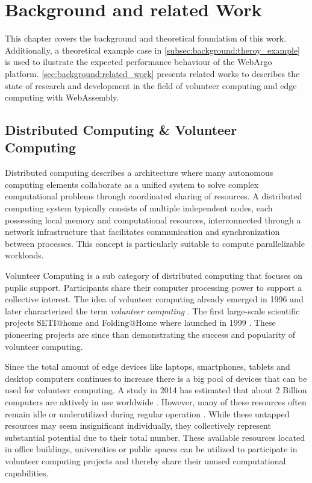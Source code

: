 \chapter{Background and related Work}
\label{ch:background}
This chapter covers the background and theoretical foundation of this work. Additionally, a theoretical example case in \autoref{subsec:background:theroy_example} is used to ilustrate the expected performance behaviour of the WebArgo platform. \autoref{sec:background:related_work} presents related works to describes the state of research and development in the field of volunteer computing and edge computing with WebAssembly.

\section{Distributed Computing \& Volunteer Computing}
Distributed computing describes a architecture where many autonomous computing elements collaborate as a unified system to solve complex computational problems through coordinated sharing of resources. A distributed computing system typically consists of multiple independent nodes, each possessing local memory and computational resources, interconnected through a network infrastructure that facilitates communication and synchronization between processes. This concept is particularly suitable to compute parallelizable workloads.

Volunteer Computing is a sub category of distributed computing that focuses on puplic support. Participants share their computer processing power to support a collective interest. The idea of volunteer computing already emerged in 1996 \cite{relatedwork:boinc1} and \citeauthor{background:vcname} later characterized the term \emph{volunteer computing} \cite{background:vcname}. The first large-scale scientific projects SETI@home and Folding@Home where launched in 1999 \cite{relatedwork:boinc1,relatedwork:seti}. These pioneering projects are since than demonstrating the success and popularity of volunteer computing.

Since the total amount of edge devices like laptops, smartphones, tablets and desktop computers continues to increase \cite{background:amountdeviceses,relatedwork:boinc1} there is a big pool of devices that can be used for volunteer computing. A study in 2014 has estimated that about 2 Billion computers are aktively in use worldwide \cite{intro:computersAmount}. However, many of these resources often remain idle or underutilized during regular operation \cite{relatedwork:mobilecloud, relatedwork:wasmedgecomputing}. While these untapped resources may seem insignificant individually, they collectively represent substantial potential due to their total number. These available resources located in office buildings, universities or public spaces can be utilized to participate in volunteer computing projects and thereby share their unused computational capabilities.

